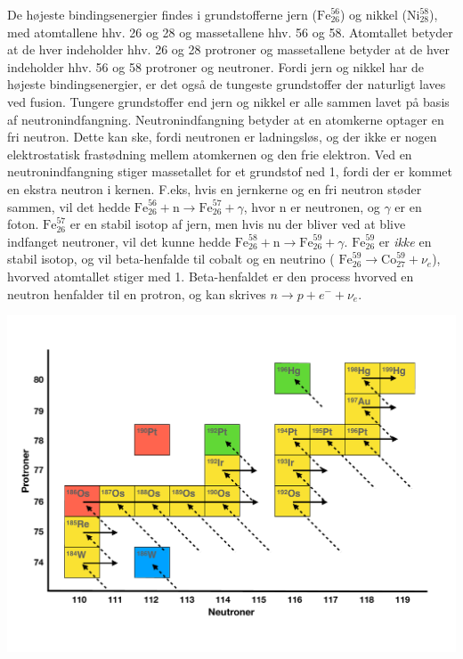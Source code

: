 \documentclass[twocolumn]{article}
\begin{document}
De højeste bindingsenergier findes i grundstofferne jern ($\mathrm{Fe}_{26}^{56}$) og nikkel ($\mathrm{Ni}_{28}^{58}$), med atomtallene hhv. 26 og 28 og massetallene hhv. 56 og 58. Atomtallet betyder at de hver indeholder hhv. 26 og 28 protroner og massetallene betyder at de hver indeholder hhv. 56 og 58 protroner og neutroner. Fordi jern og nikkel har de højeste bindingsenergier, er det også de tungeste grundstoffer der naturligt laves ved fusion. Tungere grundstoffer end jern og nikkel er alle sammen lavet på basis af neutronindfangning. Neutronindfangning betyder at en atomkerne optager en fri neutron. Dette kan ske, fordi neutronen er ladningsløs, og der ikke er nogen elektrostatisk frastødning mellem atomkernen og den frie elektron. Ved en neutronindfangning stiger massetallet for et grundstof ned 1, fordi der er kommet en ekstra neutron i kernen. F.eks, hvis en jernkerne og en fri neutron støder sammen, vil det hedde $\mathrm{Fe}_{26}^{56} + \mathrm{n} \rightarrow \mathrm{Fe}_{26}^{57} + \gamma$, hvor n er neutronen, og $\gamma$ er en foton. $\mathrm{Fe}_{26}^{57}$ er en stabil isotop af jern, men hvis nu der bliver ved at blive indfanget neutroner, vil det kunne hedde $\mathrm{Fe}_{26}^{58} + \mathrm{n} \rightarrow \mathrm{Fe}_{26}^{59} + \gamma$. $\mathrm{Fe}_{26}^{59}$ er \textit{ikke} en stabil isotop, og vil beta-henfalde til cobalt og en neutrino ( $\mathrm{Fe}_{26}^{59} \rightarrow  \mathrm{Co}_{27}^{59} + \nu_e$), hvorved atomtallet stiger med 1. Beta-henfaldet er den process hvorved en neutron henfalder til en protron, og kan skrives $n \rightarrow p + e^- + \nu_e$. 

\begin{center}
\includegraphics[width=\columnwidth]{r-process.pdf}
\end{center}
\end{document}
